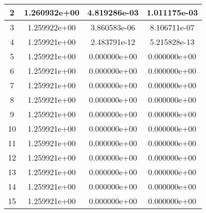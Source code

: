 \documentclass{article}
\begin{document}
\begin{enumerate}[label=\alph*.)]
\begin{table}[h]
\begin{tabular}{|c|c|c|c|}
\hline
2 & 1.260932e+00 & 4.819286e-03 & 1.011175e-03 \\
\hline
3 & 1.259922e+00 & 3.860583e-06 & 8.106711e-07 \\
\hline
4 & 1.259921e+00 & 2.483791e-12 & 5.215828e-13 \\
\hline
5 & 1.259921e+00 & 0.000000e+00 & 0.000000e+00 \\
\hline
6 & 1.259921e+00 & 0.000000e+00 & 0.000000e+00 \\
\hline
7 & 1.259921e+00 & 0.000000e+00 & 0.000000e+00 \\
\hline
8 & 1.259921e+00 & 0.000000e+00 & 0.000000e+00 \\
\hline
9 & 1.259921e+00 & 0.000000e+00 & 0.000000e+00 \\
\hline
10 & 1.259921e+00 & 0.000000e+00 & 0.000000e+00 \\
\hline
11 & 1.259921e+00 & 0.000000e+00 & 0.000000e+00 \\
\hline
12 & 1.259921e+00 & 0.000000e+00 & 0.000000e+00 \\
\hline
13 & 1.259921e+00 & 0.000000e+00 & 0.000000e+00 \\
\hline
14 & 1.259921e+00 & 0.000000e+00 & 0.000000e+00 \\
\hline
15 & 1.259921e+00 & 0.000000e+00 & 0.000000e+00 \\
\hline
\end{tabular}
\end{table}

\end{enumerate}
\end{document}
